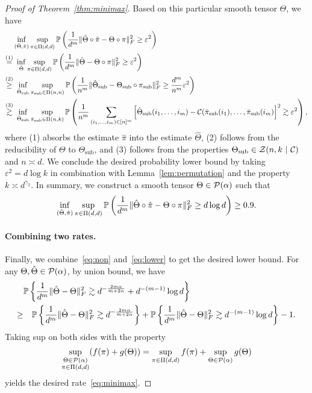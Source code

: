 \documentclass[11pt]{article}
\theoremstyle{definition}
\begin{document}
\begin{proof}[Proof of Theorem~\ref{thm:minimax}]
Based on this particular smooth tensor $\Theta$, we have
\begin{align}\label{eq:lower}
&\inf_{(\hat \Theta,\hat \pi)}\sup_{\pi\in \Pi(d,d)}\mathbb{P}\left({1\over d^m}\FnormSize{}{\hat \Theta\circ \hat \pi-\Theta\circ \pi}^2\geq \varepsilon^2\right)\notag \\
\stackrel{(1)}{=}&\ \inf_{\hat \Theta}\sup_{\pi\in \Pi(d,d)}\mathbb{P}\left({1\over d^m}\FnormSize{}{\hat \Theta-\Theta\circ \pi}^2\geq \varepsilon^2\right)\notag \\
\stackrel{(2)}{\geq}& \ \inf_{\hat  \Theta_{\text{sub}}}\sup_{\pi_{\text{sub}}\in\Pi(n,n)}\mathbb{P}\left({1\over n^m}\FnormSize{}{\hat \Theta_\text{sub}-\Theta_{\text{sub}}\circ \pi_{\text{sub}}}^2\geq {d^m\over n^m} \varepsilon^2\right)\notag \\
\stackrel{(3)}{\gtrsim} & \ \inf_{\hat  \Theta_{\text{sub}}}\sup_{\bar \pi_{\text{sub}}\in\Pi(n,k)}\mathbb{P}\left({1\over n^m}\sum_{(i_1,\ldots,i_m)\in[n]^m}\left[\hat \Theta_\text{sub}(i_1,\ldots,i_m)-\tC(\bar \pi_{\text{sub}}(i_1),\ldots,\bar \pi_{\text{sub}}(i_m)\right]^2\gtrsim \varepsilon^2\right),
\end{align}
where (1) absorbs the estimate $\hat \pi$ into the estimate $\hat \Theta$, (2) follows from the reducibility of $\Theta$ to $\Theta_{\text{sub}}$, and (3) follows from the properties $\Theta_{\text{sub}}\in \mathcal{Z}(n,k\ |\ \mathcal{C})$ and $n\asymp d$. 
We conclude the desired probability lower bound by taking $\varepsilon^2={d\log k }$ in combination with Lemma~\ref{lem:permutation} and the property $k\asymp d^{\gamma_2}$. In summary, we construct a smooth tensor $\Theta\in\mathcal{P}(\alpha)$ such that
\[
\inf_{(\hat \Theta,\hat \pi)}\sup_{\pi\in \Pi(d,d)}\mathbb{P}\left({1\over d^m}\lVert\hat \Theta\circ \hat \pi-\Theta\circ \pi\rVert_F^2\geq d\log d\right) \geq 0.9.
\]


\paragraph{Combining two rates.} Finally, we combine~\eqref{eq:non} and~\eqref{eq:lower} to get the desired lower bound. For any $\Theta, \hat \Theta \in \mathcal{P}(\alpha)$, by union bound, we have
\begin{align}
&\mathbb{P}\left\{ {1\over d^m}\lVert\hat \Theta- \Theta\rVert_F^2\gtrsim d^{-{2m\alpha\over m+2\alpha}}+d^{-(m-1)}\log d\right\}\\
\geq &\quad \mathbb{P}\left\{ {1\over d^m}\lVert\hat \Theta-\Theta\rVert_F^2\gtrsim d^{-{2m\alpha\over m+2\alpha}}\right\} +\mathbb{P}\left\{ {1\over d^m}\lVert\hat \Theta- \Theta\rVert_F^2\gtrsim d^{-(m-1)}\log d\right\}-1.
\end{align}
Taking sup on both sides with the property
\[
\sup_{\substack{\Theta\in \mathcal{P}(\alpha)\\\pi\in \Pi(d,d)}}(f(\pi)+g(\Theta))=\sup_{\pi\in \Pi(d,d)}f(\pi)+\sup_{\Theta\in \mathcal{P}(\alpha)}g(\Theta)
\]
yields the desired rate~\eqref{eq:minimax}. 
\end{proof}
\end{document}
